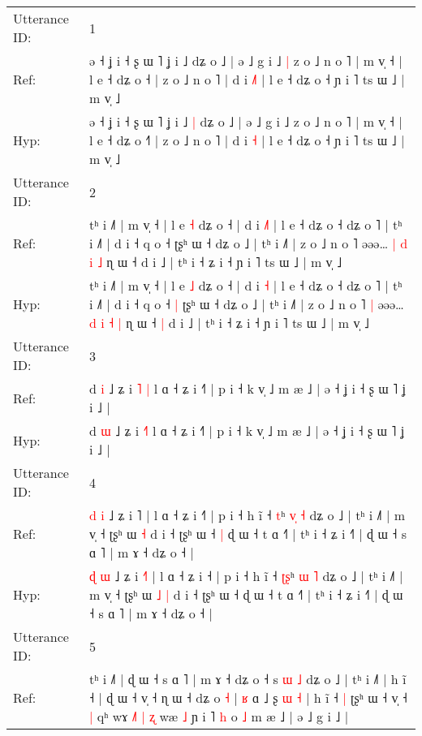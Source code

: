 \documentclass[10pt]{article}
\DeclareRobustCommand{\hl}[1]{{\textcolor{red}{#1}}}
\begin{document}
\begin{longtable}{ll}
\toprule
Utterance ID: & 1 \\
Ref: & ə ˧ ʝ i ˧ ʂ ɯ ˥ ʝ i ˩\hl{}\hl{} dʑ o ˩ | ə ˩ g i ˩\hl{ }\hl{|} z o ˩ n o ˥ | m v̩ ˧ | l e ˧ dʑ o ˧\hl{} | z o ˩ n o ˥ | d i \hl{˩}\hl{˥} | l e ˧ dʑ o ˧ ɲ i ˥ ts ɯ ˩ | m v̩ ˩
 \\
Hyp: & ə ˧ ʝ i ˧ ʂ ɯ ˥ ʝ i ˩\hl{ }\hl{|} dʑ o ˩ | ə ˩ g i ˩\hl{}\hl{} z o ˩ n o ˥ | m v̩ ˧ | l e ˧ dʑ o ˧\hl{˥} | z o ˩ n o ˥ | d i \hl{}\hl{˧} | l e ˧ dʑ o ˧ ɲ i ˥ ts ɯ ˩ | m v̩ ˩
 \\
\midrule
Utterance ID: & 2 \\
Ref: & tʰ i ˩˥ | m v̩ ˧ | l e \hl{˧} dʑ o ˧ | d i \hl{˩}\hl{˥} | l e ˧ dʑ o ˧ dʑ o ˥ | tʰ i ˩˥ | d i ˧ q o ˧\hl{}\hl{} ʈʂʰ ɯ ˧ dʑ o ˩ | tʰ i ˩˥ | z o ˩ n o ˥\hl{}\hl{} əəə… \hl{|} \hl{d} \hl{i} \hl{˩} ɳ ɯ ˧\hl{}\hl{} d i ˩ | tʰ i ˧ ʑ i ˧ ɲ i ˥ ts ɯ ˩ | m v̩ ˩
 \\
Hyp: & tʰ i ˩˥ | m v̩ ˧ | l e \hl{˩} dʑ o ˧ | d i \hl{}\hl{˧} | l e ˧ dʑ o ˧ dʑ o ˥ | tʰ i ˩˥ | d i ˧ q o ˧\hl{ }\hl{|} ʈʂʰ ɯ ˧ dʑ o ˩ | tʰ i ˩˥ | z o ˩ n o ˥\hl{ }\hl{|} əəə… \hl{d} \hl{i} \hl{˧} \hl{|} ɳ ɯ ˧\hl{ }\hl{|} d i ˩ | tʰ i ˧ ʑ i ˧ ɲ i ˥ ts ɯ ˩ | m v̩ ˩
 \\
\midrule
Utterance ID: & 3 \\
Ref: & d \hl{i} ˩ ʑ i \hl{˥}\hl{ }\hl{|} l ɑ ˧ ʑ i ˧˥ | p i ˧ k v̩ ˩ m æ ˩ | ə ˧ ʝ i ˧ ʂ ɯ ˥ ʝ i ˩ |
 \\
Hyp: & d \hl{ɯ} ˩ ʑ i \hl{}\hl{˧}\hl{˥} l ɑ ˧ ʑ i ˧˥ | p i ˧ k v̩ ˩ m æ ˩ | ə ˧ ʝ i ˧ ʂ ɯ ˥ ʝ i ˩ |
 \\
\midrule
Utterance ID: & 4 \\
Ref: & \hl{d} \hl{i} ˩ ʑ i \hl{}˥ | l ɑ ˧ ʑ i ˧\hl{˥} | p i ˧ h ĩ ˧ \hl{}\hl{t}ʰ \hl{v}\hl{̩} \hl{˧} dʑ o ˩ | tʰ i ˩˥ | m v̩ ˧ ʈʂʰ ɯ\hl{}\hl{} \hl{˧} d i ˧ ʈʂʰ ɯ ˧\hl{ }\hl{|} ɖ ɯ ˧ t ɑ ˧˥ | tʰ i ˧ ʑ i ˧˥ | ɖ ɯ ˧ s ɑ ˥ | m ɤ ˧ dʑ o ˧ |
 \\
Hyp: & \hl{ɖ} \hl{ɯ} ˩ ʑ i \hl{˧}˥ | l ɑ ˧ ʑ i ˧\hl{} | p i ˧ h ĩ ˧ \hl{ʈ}\hl{ʂ}ʰ \hl{}\hl{ɯ} \hl{˥} dʑ o ˩ | tʰ i ˩˥ | m v̩ ˧ ʈʂʰ ɯ\hl{ }\hl{˩} \hl{|} d i ˧ ʈʂʰ ɯ ˧\hl{}\hl{} ɖ ɯ ˧ t ɑ ˧˥ | tʰ i ˧ ʑ i ˧˥ | ɖ ɯ ˧ s ɑ ˥ | m ɤ ˧ dʑ o ˧ |
 \\
\midrule
Utterance ID: & 5 \\
Ref: & tʰ i ˩˥ | ɖ ɯ ˧ s ɑ ˥ | m ɤ ˧ dʑ o ˧ s \hl{ɯ} \hl{˩} dʑ o ˩ | tʰ i ˩˥ | h ĩ ˧ | ɖ ɯ ˧ v̩ ˧\hl{}\hl{}\hl{} ɳ ɯ ˧\hl{} dʑ o \hl{˧} |\hl{ }\hl{ʁ} ɑ ˩ ʂ \hl{ɯ} \hl{˧} | h ĩ ˧\hl{ }\hl{|} ʈʂʰ ɯ ˧ v̩ ˧\hl{ }\hl{|} qʰ wɤ\hl{ }\hl{˩}\hl{˥} \hl{|} \hl{ʐ} wæ \hl{˩} ɲ i ˥ \hl{h} o \hl{˩} m æ ˩ | ə ˩ g i ˩ |

\end{longtable}
\end{document}
